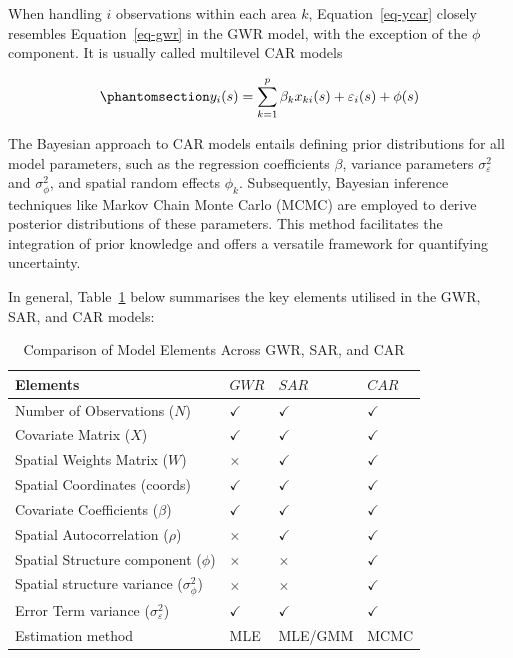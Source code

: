 \documentclass[
  default,
]{sn-jnl}
\begin{document}
When handling \(i\) observations within each area \(k\),
Equation~\ref{eq-ycar} closely resembles Equation~\ref{eq-gwr} in the
GWR model, with the exception of the \(\phi\) component. It is usually
called multilevel CAR models

\begin{equation}\phantomsection\label{eq-ycar}{
y_i(s) = \sum_{k=1}^p \beta_k x_{ki}(s) + \varepsilon_i(s) + \phi(s)
}\end{equation}

The Bayesian approach to CAR models entails defining prior distributions
for all model parameters, such as the regression coefficients \(\beta\),
variance parameters \(\sigma_{\varepsilon}^2\) and \(\sigma_{\phi}^2\),
and spatial random effects \(\phi_k\). Subsequently, Bayesian inference
techniques like Markov Chain Monte Carlo (MCMC) are employed to derive
posterior distributions of these parameters. This method facilitates the
integration of prior knowledge and offers a versatile framework for
quantifying uncertainty.

In general, Table~\ref{tbl-summarymethod} below summarises the key
elements utilised in the GWR, SAR, and CAR models:

\begingroup\fontsize{9}{11}\selectfont

\begin{longtable}[t]{llll}

\caption{\label{tbl-summarymethod}Comparison of Model Elements Across
GWR, SAR, and CAR}

\tabularnewline

\toprule
Elements & $GWR$ & $SAR$ & $CAR$\\
\midrule
Number of Observations ($N$) & $\checkmark$ & $\checkmark$ & $\checkmark$\\
Covariate Matrix ($X$) & $\checkmark$ & $\checkmark$ & $\checkmark$\\
Spatial Weights Matrix ($W$) & $\times$ & $\checkmark$ & $\checkmark$\\
Spatial Coordinates (coords) & $\checkmark$ & $\checkmark$ & $\checkmark$\\
Covariate Coefficients ($\beta$) & $\checkmark$ & $\checkmark$ & $\checkmark$\\
\addlinespace
Spatial Autocorrelation ($\rho$) & $\times$ & $\checkmark$ & $\checkmark$\\
Spatial Structure component ($\phi$) & $\times$ & $\times$ & $\checkmark$\\
Spatial structure variance ($\sigma_{\phi}^2$) & $\times$ & $\times$ & $\checkmark$\\
Error Term variance ($\sigma_{\varepsilon}^2$) & $\checkmark$ & $\checkmark$ & $\checkmark$\\
Estimation method & MLE & MLE/GMM & MCMC\\
\bottomrule

\end{longtable}
\end{document}
